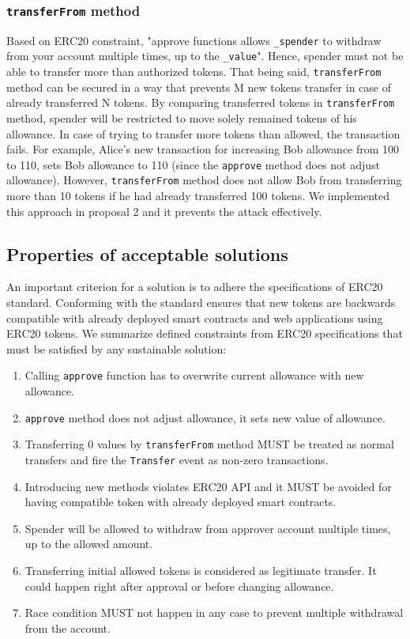 \subsubsection*{\texttt{transferFrom} method} Based on ERC20 constraint, "approve functions allows \texttt{\_spender} to withdraw from your account multiple times, up to the \texttt{\_value}". Hence, spender must not be able to transfer more than authorized tokens. That being said, \texttt{transferFrom} method can be secured in a way that prevents M new tokens transfer in case of already transferred N tokens. By comparing transferred tokens in \texttt{transferFrom} method, spender will be restricted to move solely remained tokens of his allowance. In case of trying to transfer more tokens than allowed, the transaction fails. For example, Alice's new transaction for increasing Bob allowance from 100 to 110, sets Bob allowance to 110 (since the \texttt{approve} method does not adjust allowance). However, \texttt{transferFrom} method does not allow Bob from transferring more than 10 tokens if he had already transferred 100 tokens. We implemented this approach in proposal 2 and it prevents the attack effectively.

\subsection{Properties of acceptable solutions}
An important criterion for a solution is to adhere the specifications of ERC20 standard. Conforming with the standard ensures that new tokens are backwards compatible with already deployed smart contracts and web applications using ERC20 tokens. We summarize defined constraints from ERC20 specifications \cite{Ref08} that must be satisfied by any sustainable solution:

\begin{enumerate}
	\item Calling \texttt{approve} function has to overwrite current allowance with new allowance.
	\item \texttt{approve} method does not adjust allowance, it sets new value of allowance.
	\item Transferring 0 values by \texttt{transferFrom} method MUST be treated as normal transfers and fire the \texttt{Transfer} event as non-zero transactions.
	\item Introducing new methods violates ERC20 API and it MUST be avoided for having compatible token with already deployed smart contracts.
	\item Spender will be allowed to withdraw from approver account multiple times, up to the allowed amount.
	\item Transferring initial allowed tokens is considered as legitimate transfer. It could happen right after approval or before changing allowance.
	\item Race condition MUST not happen in any case to prevent multiple withdrawal from the account.
\end{enumerate}